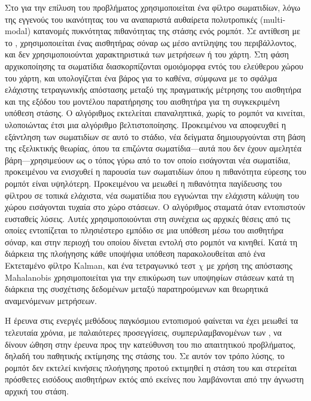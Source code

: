 Στο \cite{Gasparri2007a} για την επίλυση του προβλήματος χρησιμοποιείται ένα
φίλτρο σωματιδίων, λόγω της εγγενούς του ικανότητας του να αναπαριστά αυθαίρετα
πολυτροπικές (multi-modal) κατανομές πυκνότητας πιθανότητας της στάσης ενός
ρομπότ. Σε αντίθεση με το \cite{Jensfelt2001a}, χρησιμοποιείται ένας αισθητήρας
σόναρ ως μέσο αντίληψης του περιβάλλοντος, και δεν χρησιμοποιούνται
χαρακτηριστικά των μετρήσεων ή του χάρτη.  Στη φάση αρχικοποίησης τα σωματίδια
διασκορπίζονται ομοιόμορφα εντός του ελεύθερου χώρου του χάρτη, και
υπολογίζεται ένα βάρος για το καθένα, σύμφωνα με το σφάλμα ελάχιστης
τετραγωνικής απόστασης μεταξύ της πραγματικής μέτρησης του αισθητήρα και της
εξόδου του μοντέλου παρατήρησης του αισθητήρα για τη συγκεκριμένη υπόθεση
στάσης. Ο αλγόριθμος εκτελείται επαναληπτικά, χωρίς το ρομπότ να κινείται,
υλοποιώντας έτσι μια αλγόριθμο βελτιστοποίησης. Προκειμένου να αποφευχθεί η
εξάντληση των σωματιδίων σε αυτό το στάδιο, νέα δείγματα δημιουργούνται στη
βάση της εξελικτικής θεωρίας, όπου τα επιζώντα σωματίδια---αυτά που δεν έχουν
αμελητέα βάρη---χρησιμεύουν ως ο τόπος γύρω από το τον οποίο εισάγονται νέα
σωματίδια, προκειμένου να ενισχυθεί η παρουσία των σωματιδίων όπου η πιθανότητα
εύρεσης του ρομπότ είναι υψηλότερη. Προκειμένου να μειωθεί η πιθανότητα
παγίδευσης του φίλτρου σε τοπικά ελάχιστα, νέα σωματίδια που εγγυώνται την
ελάχιστη κάλυψη του χώρου εισάγονται τυχαία στο χώρο στάσεων. Ο αλγόριθμος
σταματά όταν εντοπιστούν ευσταθείς λύσεις. Αυτές χρησιμοποιούνται στη συνέχεια
ως αρχικές θέσεις από τις οποίες εντοπίζεται το πλησιέστερο εμπόδιο σε μια
υπόθεση μέσω του αισθητήρα σόναρ, και στην περιοχή του οποίου δίνεται εντολή
στο ρομπότ να κινηθεί. Κατά τη διάρκεια της πλοήγησης κάθε υποψήφια υπόθεση
παρακολουθείται από ένα Εκτεταμένο φίλτρο Kalman, και ένα τετραγωνικό τεστ
$\chi$ με χρήση της απόστασης Mahalanobis χρησιμοποιείται για την επικύρωση των
υποψηφίων στάσεων κατά τη διάρκεια της συσχέτισης δεδομένων μεταξύ
παρατηρούμενων και θεωρητικά αναμενόμενων μετρήσεων.

Η έρευνα στις ενεργές μεθόδους παγκόσμιου εντοπισμού φαίνεται να έχει μειωθεί
τα τελευταία χρόνια, με παλαιότερες προσεγγίσεις, συμπεριλαμβανομένων των
\cite{Manasse1988,Kleinberg,Romanik1996,Dudek1998,OKanea,Rao2007}, να δίνουν
ώθηση στην έρευνα προς την κατεύθυνση του πιο απαιτητικού προβλήματος, δηλαδή
του παθητικής εκτίμησης της στάσης του. Σε αυτόν τον τρόπο λύσης, το ρομπότ δεν
εκτελεί κινήσεις πλοήγησης προτού εκτιμηθεί η στάση του και στερείται πρόσθετες
εισόδους αισθητήρων εκτός από εκείνες που λαμβάνονται από την άγνωστη αρχική
του στάση.

